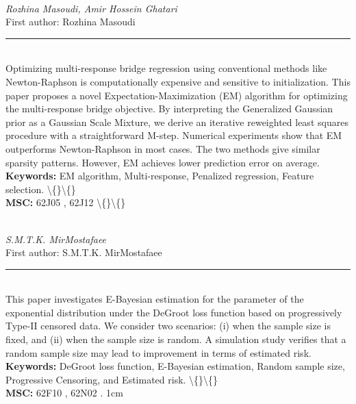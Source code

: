 \documentclass[10pt,twoside]{article}
\begin{document}
\noindent\begin{minipage}[t][\textheight]{\textwidth}
\\[0.35em]
{\itshape Rozhina Masoudi, Amir Hossein Ghatari}\\[0.2em]
{\footnotesize First author: Rozhina Masoudi}\\[0.45em]
\noindent\rule{\textwidth}{0.3pt}\\[0.4em]
{\footnotesize  Optimizing multi-response bridge regression using conventional methods like Newton-Raphson is computationally expensive and sensitive to initialization. This paper proposes a novel Expectation-Maximization (EM) algorithm for optimizing the multi-response bridge objective. By interpreting the Generalized Gaussian prior as a Gaussian Scale Mixture, we derive an iterative reweighted least squares procedure with a straightforward M-step. Numerical experiments show that EM outperforms Newton-Raphson in most cases. The two methods give similar sparsity patterns. However, EM achieves lower prediction error on average.}\\[0.4em]
{\footnotesize\bfseries Keywords:} {\footnotesize EM algorithm, Multi-response, Penalized regression, Feature selection. \textbackslash\{\}\textbackslash\{\}}\\[0.15em]
{\footnotesize\bfseries MSC:} {\footnotesize 62J05 , 62J12 \textbackslash\{\}\textbackslash\{\}}\\
\vfill
\end{minipage}
\newpage

\noindent\begin{minipage}[t][\textheight]{\textwidth}
\\[0.35em]
{\itshape S.M.T.K. MirMostafaee}\\[0.2em]
{\footnotesize First author: S.M.T.K. MirMostafaee}\\[0.45em]
\noindent\rule{\textwidth}{0.3pt}\\[0.4em]
{\footnotesize  This paper investigates E-Bayesian estimation for the parameter of the exponential distribution under the DeGroot loss function based on progressively Type-II censored data. We consider two scenarios: (i) when the sample size is fixed, and (ii) when the sample size is random. A simulation study verifies that a random sample size may lead to improvement in terms of estimated risk.}\\[0.4em]
{\footnotesize\bfseries Keywords:} {\footnotesize DeGroot loss function, E-Bayesian estimation, Random sample size, Progressive Censoring, and Estimated risk. \textbackslash\{\}\textbackslash\{\}}\\[0.15em]
{\footnotesize\bfseries MSC:} {\footnotesize 62F10 , 62N02 . 1cm}\\
\vfill
\end{minipage}
\newpage
\end{document}
